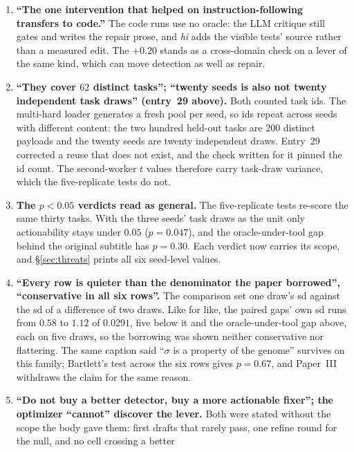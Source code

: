\documentclass[11pt]{article}
\begin{document}
\begin{enumerate}
    replicates, which the companion paper on the evolved verifier says is confounded with drift
    and cannot be separated from it. The sentence now says drift is unmeasured.
  \item \textbf{``The one intervention that helped on instruction-following transfers to code.''}
    The code runs use no oracle: the LLM critique still gates and writes the repair prose, and
    \emph{hi} adds the visible tests' source rather than a measured edit. The $+0.20$ stands as a
    cross-domain check on a lever of the same kind, which can move detection as well as repair.
  \item \textbf{``They cover $62$ distinct tasks''; ``twenty seeds is also not twenty independent
    task draws'' (entry~29 above).} Both counted task ids. The multi-hard loader generates a fresh
    pool per seed, so ids repeat across seeds with different content: the two hundred held-out
    tasks are $200$ distinct payloads and the twenty seeds are twenty independent draws. Entry~29
    corrected a reuse that does not exist, and the check written for it pinned the id count. The
    second-worker $t$ values therefore carry task-draw variance, which the five-replicate tests do
    not.
  \item \textbf{The $p<0.05$ verdicts read as general.} The five-replicate tests re-score the same
    thirty tasks. With the three seeds' task draws as the unit only actionability stays under
    $0.05$ ($p = 0.047$), and the oracle-under-tool gap behind the original subtitle has $p = 0.30$. Each
    verdict now carries its scope, and \S\ref{sec:threats} prints all six seed-level values.
  \item \textbf{``Every row is quieter than the denominator the paper borrowed'', ``conservative in
    all six rows''.} The comparison set one draw's sd against the sd of a difference of two draws.
    Like for like, the paired gaps' own sd runs from $0.58$ to $1.12$ of $0.0291$, five below it
    and the oracle-under-tool gap above, each on five draws, so the borrowing was shown neither
    conservative nor flattering. The same caption said ``$\sigma$ is a property of the genome''
    survives on this family; Bartlett's test across the six rows gives $p = 0.67$, and Paper~III
    withdraws the claim for the same reason.
  \item \textbf{``Do not buy a better detector, buy a more actionable fixer''; the optimizer
    ``cannot'' discover the lever.} Both were stated without the scope the body gave them: first
    drafts that rarely pass, one refine round for the null, and no cell crossing a better

\end{enumerate}
\end{document}

